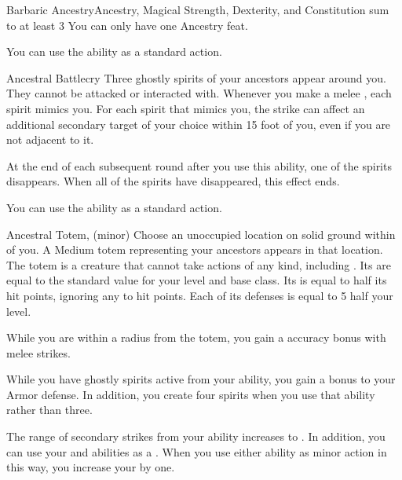     \begin{magicalfeat}{Barbaric Ancestry}{Ancestry, Magical}
        \featpre Strength, Dexterity, and Constitution sum to at least 3
         You can only have one Ancestry feat.

         You can use the  ability as a standard action.
        \begin{magicalactiveability}{Ancestral Battlecry}
            Three ghostly spirits of your ancestors appear around you.
            They cannot be attacked or interacted with.
            Whenever you make a melee , each spirit mimics you.
            For each spirit that mimics you, the strike can affect an additional secondary target of your choice within 15 foot  of you, even if you are not adjacent to it.

            At the end of each subsequent round after you use this ability, one of the spirits disappears.
            When all of the spirits have disappeared, this effect ends.
        \end{magicalactiveability}

         You can use the  ability as a standard action.
        \begin{magicalsustainability}{Ancestral Totem}{,  (minor)}
            Choose an unoccupied location on solid ground within \shortrange of you.
            A Medium totem representing your ancestors appears in that location.
            The totem is a creature that cannot take actions of any kind, including .
            Its  are equal to the standard value for your level and base class.
            Its  is equal to half its hit points, ignoring any  to hit points.
            Each of its defenses is equal to 5 \add half your level.

            While you are within a \medarea radius  from the totem, you gain a  accuracy bonus with melee strikes.
        \end{magicalsustainability}

         While you have ghostly spirits active from your  ability, you gain a  bonus to your Armor defense.
        In addition, you create four spirits when you use that ability rather than three.

         The range of secondary strikes from your  ability increases to \shortrange.
        In addition, you can use your  and  abilities as a .
        When you use either ability as minor action in this way, you increase your  by one.
    \end{magicalfeat}

